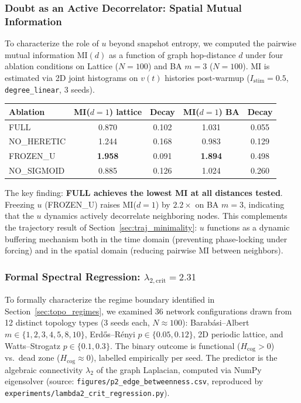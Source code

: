 \documentclass[11pt]{article}
\begin{document}
\subsubsection*{Doubt as an Active Decorrelator: Spatial Mutual Information}
\label{sec:mi_analysis}

To characterize the role of $u$ beyond snapshot entropy, we computed the pairwise mutual information MI$(d)$ as a function of graph hop-distance $d$ under four ablation conditions on Lattice ($N=100$) and BA $m=3$ ($N=100$). MI is estimated via 2D joint histograms on $v(t)$ histories post-warmup ($I_{\mathrm{stim}}=0.5$, \texttt{degree\_linear}, 3 seeds).

\begin{center}
\begin{tabular}{lcccc}
\toprule
Ablation & MI($d=1$) lattice & Decay & MI($d=1$) BA & Decay \\
\midrule
FULL       & 0.870 & 0.102 & 1.031 & 0.055 \\
NO\_HERETIC & 1.244 & 0.168 & 0.983 & 0.129 \\
FROZEN\_U  & \textbf{1.958} & 0.091 & \textbf{1.894} & 0.498 \\
NO\_SIGMOID & 0.885 & 0.126 & 1.024 & 0.260 \\
\bottomrule
\end{tabular}
\end{center}

The key finding: \textbf{FULL achieves the lowest MI at all distances tested}. Freezing $u$ (FROZEN\_U) raises MI($d=1$) by $2.2\times$ on BA $m=3$, indicating that the $u$ dynamics actively decorrelate neighboring nodes. This complements the trajectory result of Section~\ref{sec:traj_minimality}: $u$ functions as a dynamic buffering mechanism both in the time domain (preventing phase-locking under forcing) and in the spatial domain (reducing pairwise MI between neighbors).

\subsubsection*{Formal Spectral Regression: $\lambda_{2,\mathrm{crit}} = 2.31$}
\label{sec:lambda2}

To formally characterize the regime boundary identified in Section~\ref{sec:topo_regimes}, we examined 36 network configurations drawn from 12 distinct topology types (3 seeds each, $N \approx 100$): Barab\'asi--Albert $m \in \{1, 2, 3, 4, 5, 8, 10\}$, Erd\H{o}s--R\'enyi $p \in \{0.05, 0.12\}$, 2D periodic lattice, and Watts--Strogatz $p \in \{0.1, 0.3\}$. The binary outcome is functional ($H_{\mathrm{cog}} > 0$) vs.\ dead zone ($H_{\mathrm{cog}} \approx 0$), labelled empirically per seed. The predictor is the algebraic connectivity $\lambda_2$ of the graph Laplacian, computed via NumPy eigensolver (source: \texttt{figures/p2\_edge\_betweenness.csv}, reproduced by \texttt{experiments/lambda2\_crit\_regression.py}).
\end{document}
